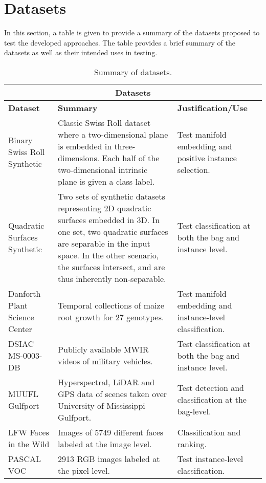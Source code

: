 \section{Datasets}
In this section, a table is given to provide a summary of the datasets proposed to test the developed approaches.  The table provides a brief summary of the datasets as well as their intended uses in testing.

\begin{longtable}{ |p{4cm}|p{6cm}|p{4cm}|  } 
	\caption{Summary of datasets.}
	\label{tab:Datasets}\\
	\hline
	\multicolumn{3}{|c|}{\textbf{Datasets}} \\
	\hline
	\textbf{Dataset} & \textbf{Summary} & \textbf{Justification/Use}\\
	\hline
	Binary Swiss Roll Synthetic & Classic Swiss Roll dataset where a two-dimensional plane is embedded in three-dimensions. Each half of the two-dimensional intrinsic plane is given a class label. & Test manifold embedding and positive instance selection.\\
	\hline
	Quadratic Surfaces Synthetic   &  Two sets of synthetic datasets representing 2D quadratic surfaces embedded in 3D.  In one set, two quadratic surfaces are separable in the input space.  In the other scenario, the surfaces intersect, and are thus inherently non-separable.  & Test classification at both the bag and instance level.   \\
	\hline
	Danforth Plant Science Center & Temporal collections of maize root growth for 27 genotypes.   & Test manifold embedding and instance-level classification. \\
	\hline
	DSIAC MS-0003-DB \citep{DSIACATR}   &  Publicly available MWIR videos of military vehicles. & Test classification at both the bag and instance level.   \\
	\hline
	MUUFL Gulfport \citep{MUUFL} &  Hyperspectral, LiDAR and GPS data of scenes taken over University of Mississippi Gulfport. & Test detection and classification at the bag-level.   \\
	\hline
	LFW Faces in the Wild \citep{LFW} & Images of 5749 different faces labeled at the  image level. & Classification and ranking. \\
	\hline
	PASCAL VOC \citep{PASCALVOC}  & 2913 RGB images labeled at the pixel-level. & Test instance-level classification. \\
	\hline
\end{longtable}






